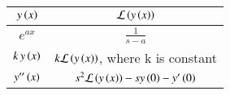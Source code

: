 \setlength{\arrayrulewidth}{0.3mm}
\setlength{\tabcolsep}{20pt}
\renewcommand{\arraystretch}{1.3}



\begin{tabular}{|c|c|}
\hline

$y\left(x\right)$ & $\mathcal{L}\left(y\left(x\right)\right)$\\
\hline
$e^{ax}$ & $\frac{1}{s-a}$\\
\hline
$k\, y\left(x\right)$ & $k\mathcal{L}\left(y\left(x\right)\right)$, where k is constant\\
\hline
$y''\left(x\right)$ & $s^2\mathcal{L}\left(y\left(x\right)\right) - sy\left(0\right) - y'\left(0\right)$\\
\hline
\end{tabular}